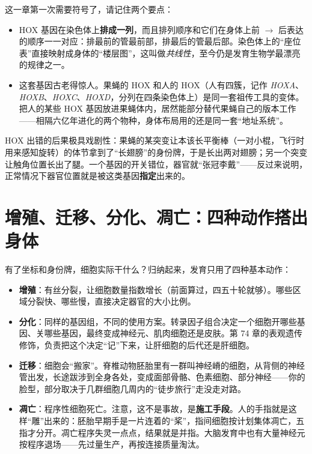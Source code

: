 这一章第一次需要符号了，请记住两个要点：

\begin{itemize}[itemsep=2pt]
\item HOX 基因在染色体上\textbf{排成一列}，而且排列顺序和它们在身体上前 $\rightarrow$ 后表达的顺序一一对应：排最前的管最前部，排最后的管最后部。染色体上的“座位表”直接映射成身体的“楼层图”，这叫做\emph{共线性}，至今仍是发育生物学最漂亮的规律之一。
\item 这套基因古老得惊人。果蝇的 HOX 和人的 HOX（人有四簇，记作 \textit{HOXA}、\textit{HOXB}、\textit{HOXC}、\textit{HOXD}，分列在四条染色体上）是同一套祖传工具的变体。把人的某些 HOX 基因放进果蝇体内，居然能部分替代果蝇自己的版本工作——相隔六亿年进化的两个物种，身体布局用的还是同一套“地址系统”。
\end{itemize}

HOX 出错的后果极具戏剧性：果蝇的某突变让本该长平衡棒（一对小棍，飞行时用来感知旋转）的体节拿到了“长翅膀”的身份牌，于是长出两对翅膀；另一个突变让触角位置长出了腿。一个基因的开关错位，器官就“张冠李戴”——反过来说明，正常情况下器官位置就是被这类基因\textbf{指定}出来的。

\section{增殖、迁移、分化、凋亡：四种动作搭出身体}

有了坐标和身份牌，细胞实际干什么？归纳起来，发育只用了四种基本动作：

\begin{itemize}[itemsep=2pt]
\item \textbf{增殖}：有丝分裂，让细胞数量指数增长（前面算过，四五十轮就够）。哪些区域分裂快、哪些慢，直接决定器官的大小比例。
\item \textbf{分化}：同样的基因组，不同的使用方案。转录因子组合决定一个细胞开哪些基因、关哪些基因，最终变成神经元、肌肉细胞还是皮肤。第 74 章的表观遗传修饰，负责把这个决定“记”下来，让肝细胞的后代还是肝细胞。
\item \textbf{迁移}：细胞会“搬家”。脊椎动物胚胎里有一群叫神经嵴的细胞，从背侧的神经管出发，长途跋涉到全身各处，变成面部骨骼、色素细胞、部分神经——你的脸型，部分取决于几群细胞几周内的“徒步旅行”走没走对路。
\item \textbf{凋亡}：程序性细胞死亡。注意，这不是事故，是\textbf{施工手段}。人的手指就是这样“雕”出来的：胚胎早期手是一片连着的“桨”，指间细胞按计划集体凋亡，五指才分开。凋亡程序失灵一点点，结果就是并指。大脑发育中也有大量神经元按程序退场——先过量生产，再按连接质量淘汰。
\end{itemize}

